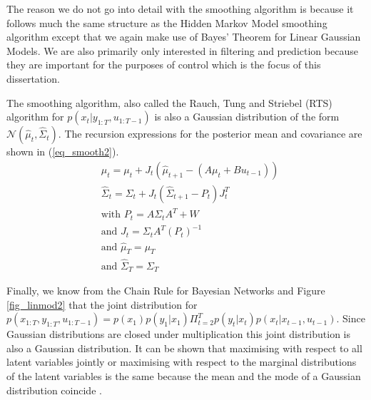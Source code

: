 \documentclass[../masters.tex]{subfiles}
\begin{document}
The reason we do not go into detail with the smoothing algorithm is because it follows much the same structure as the Hidden Markov Model smoothing algorithm except that we again make use of Bayes' Theorem for Linear Gaussian Models. We are also primarily only interested in filtering and prediction because they are important for the purposes of control which is the focus of this dissertation.

The smoothing algorithm, also called the Rauch, Tung and Striebel (RTS) algorithm for $p(x_t|y_{1:T},u_{1:T-1})$ is also a Gaussian distribution of the form $\mathcal{N}(\hat{\mu}_t, \hat{\Sigma}_t)$. The recursion expressions for the posterior mean and covariance are shown in (\ref{eq_smooth2}).
\begin{equation}
\begin{aligned}
&\hat{\mu}_t = \mu_t + J_t\left(\hat{\mu}_{t+1}-(A\mu_t+Bu_{t-1})\right) \\
&\hat{\Sigma}_t = \Sigma_t + J_t(\hat{\Sigma}_{t+1}-P_t)J^T_t \\
&\text{with } P_t = A\Sigma_tA^T + W \\
&\text{and } J_t = \Sigma_t A^T (P_t)^{-1}\\
&\text{and } \hat{\mu}_T = \mu_T\\
&\text{and } \hat{\Sigma}_T = \Sigma_T
\end{aligned}
\label{eq_smooth2}
\end{equation}

Finally, we know from the Chain Rule for Bayesian Networks and Figure \ref{fig_linmod2} that the joint distribution for $p(x_{1:T},y_{1:T}, u_{1:T-1}) = p(x_1)p(y_1|x_1)\Pi^T_{t=2} p(y_t|x_t)p(x_{t}|x_{t-1},u_{t-1})$. Since Gaussian distributions are closed under multiplication this joint distribution is also a Gaussian distribution. It can be shown that maximising with respect to all latent variables jointly or maximising with respect to the marginal distributions of the latent variables is the same because the mean and the mode of a Gaussian distribution coincide \cite{barber}.
\end{document}
